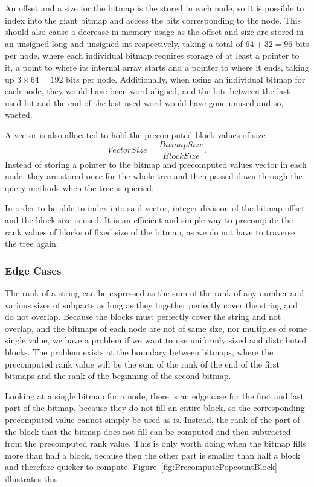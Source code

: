 An offset and a size for the bitmap is the stored in each node, so it is possible to index into the giant bitmap and access the bits corresponding to the node.
This should also cause a decrease in memory usage as the offset and size are stored in an unsigned long and unsigned int respectively, taking a total of $64+32=96$ bits per node, where each individual bitmap requires storage of at least a pointer to it, a point to where its internal array starts and a pointer to where it ends, taking up $3 \times 64=192$ bits per node.
Additionally, when using an individual bitmap for each node, they would have been word-aligned, and the bits between the last used bit and the end of the last used word would have gone unused and so, wasted.

A vector is also allocated to hold the precomputed block values of size
\[\mathit{VectorSize} = \frac{\mathit{BitmapSize}}{\mathit{BlockSize}}.\]
Instead of storing a pointer to the bitmap and precomputed values vector in each node, they are stored once for the whole tree and then passed down through the query methods when the tree is queried.

In order to be able to index into said vector, integer division of the bitmap offset and the block size is used. It is an efficient and simple way to precompute the rank values of blocks of fixed size of the bitmap, as we do not have to traverse the tree again.


\subsubsection{Edge Cases}
\label{sec:rankQueriesWithPrecomputedRanksEdgeCases}
The rank of a string can be expressed as the sum of the rank of any number and various sizes of subparts as long as they together perfectly cover the string and do not overlap.
Because the blocks must perfectly cover the string and not overlap, and the bitmaps of each node are not of same size, nor multiples of some single value, we have a problem if we want to use uniformly sized and distributed blocks.
The problem exists at the boundary between bitmaps, where the precomputed rank value will be the sum of the rank of the end of the first bitmaps and the rank of the beginning of the second bitmap.

Looking at a single bitmap for a node, there is an edge case for the first and last part of the bitmap, because they do not fill an entire block, so the corresponding precomputed value cannot simply be used as-is.
Instead, the rank of the part of the block that the bitmap does not fill can be computed and then subtracted from the precomputed rank value.
This is only worth doing when the bitmap fills more than half a block, because then the other part is smaller than half a block and therefore quicker to compute.
Figure~\ref{fig:PrecomputePopcountBlock} illustrates this.



